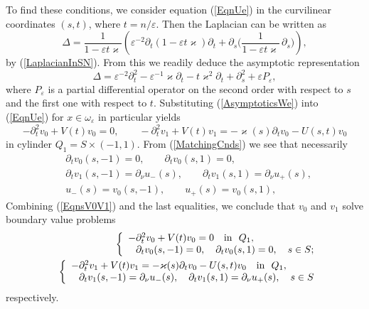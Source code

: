 \documentclass[graybox]{svmult}
\renewcommand{\kappa}{\varkappa}
\newcommand{\eps}{\varepsilon}
\newcommand{\eqref}[1]{(\ref{#1})}
\newcommand{\pte}{\partial_t}
\begin{document}
To find these conditions, we consider equation \eqref{EqnUe} in the curvilinear coordinates $(s,t)$, where $t=n/\eps$.
Then the Laplacian can be written as
\begin{equation}
  \Delta =\frac1{1-\eps t\kappa}\left( \eps^{-2}\partial_t
(1-\eps t\kappa)\partial_t +\partial_s
\Big(\frac1{1-\eps t\kappa}\,\partial_s\Big)\right),
\end{equation}
by \eqref{LaplacianInSN}.
From this we readily deduce the asymptotic representation
$$
\Delta= \eps^{-2}\partial^2_t-\eps^{-1}\kappa\partial_t-t \kappa^2\partial_t+\partial^2_s+\eps P_\eps,
$$
where $P_\eps$ is a partial differential operator on the second order with respect to $s$ and the first one with respect to $t$.
Substituting \eqref{AsymptoticsWe} into \eqref{EqnUe} for $x\in \omega_\eps$ in particular yields
\begin{equation}\label{EqnsV0V1}
-\pte^2 v_0+V(t)v_0=0, \qquad -\pte^2 v_1+V(t)v_1=-\kappa(s)\pte v_0-U(s,t)v_0
\end{equation}
in cylinder $Q_1=S\times(-1,1)$.
From \eqref{MatchingCnds} we see that necessarily
\begin{eqnarray} \nonumber
  &\partial_t v_0(s,- 1)=0, \qquad \partial_t v_0(s, 1)=0, \\\nonumber
&\partial_t v_1(s, -1)=\partial_\nu u_-(s), \qquad
\partial_t v_1(s, 1)=\partial_\nu u_+(s),\\
\label{FittingCnds}
  &u_-(s)=v_0(s,-1),\qquad u_+(s)=v_0(s,1),
\end{eqnarray}
Combining \eqref{EqnsV0V1} and the last equalities, we conclude that $v_0$ and $v_1$ solve boundary value problems
\begin{eqnarray}\label{problemV0}
&&\left\{
  \begin{array}{ll}
    -\pte^2 v_0+V(t)v_0=0 \quad \hbox{in \ } Q_1, \\
    \phantom{-}\partial_t v_0(s,- 1)=0, \quad \partial_t v_0(s, 1)=0, \quad s\in S;
  \end{array}
\right.\\\label{problemV1}
&&\left\{
  \begin{array}{ll}
    -\pte^2 v_1+V(t)v_1=-\kappa(s)\pte v_0-U(s,t)v_0\quad \hbox{in \ } Q_1, \\
    \phantom{-}\partial_t v_1(s, -1)=\partial_\nu u_-(s), \quad
\partial_t v_1(s, 1)=\partial_\nu u_+(s), \quad s\in S
  \end{array}
\right.
\end{eqnarray}
respectively.
\end{document}
